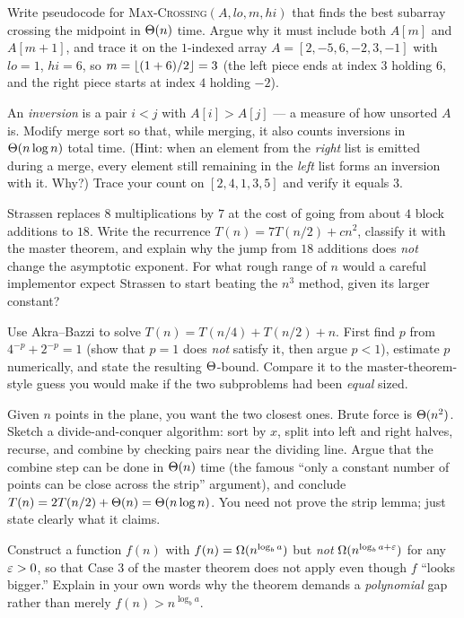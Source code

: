 \begin{exercise}
Write pseudocode for \textsc{Max-Crossing}$(A,lo,m,hi)$ that finds the best
subarray crossing the midpoint in $\Theta(n)$ time. Argue why it must include both
$A[m]$ and $A[m+1]$, and trace it on the $1$-indexed array
$A=[2,-5,6,-2,3,-1]$ with $lo=1$, $hi=6$, so $m=\lfloor(1+6)/2\rfloor=3$ (the left
piece ends at index $3$ holding $6$, and the right piece starts at index $4$
holding $-2$).
\end{exercise}

\begin{exercise}
An \emph{inversion} is a pair $i<j$ with $A[i]>A[j]$ --- a measure of how unsorted
$A$ is. Modify merge sort so that, while merging, it also counts inversions in
$\Theta(n\log n)$ total time. (Hint: when an element from the \emph{right} list is
emitted during a merge, every element still remaining in the \emph{left} list
forms an inversion with it. Why?) Trace your count on $[2,4,1,3,5]$ and verify it
equals $3$.
\end{exercise}

\begin{exercise}
Strassen replaces $8$ multiplications by $7$ at the cost of going from
about $4$ block additions to $18$. Write the recurrence
$T(n)=7T(n/2)+cn^2$, classify it with the master theorem, and explain why the jump
from $18$ additions does \emph{not} change the asymptotic exponent. For what rough
range of $n$ would a careful implementor expect Strassen to start beating the
$n^3$ method, given its larger constant?
\end{exercise}

\begin{exercise}
Use Akra--Bazzi to solve $T(n)=T(n/4)+T(n/2)+n$. First find $p$ from
$4^{-p}+2^{-p}=1$ (show that $p=1$ does \emph{not} satisfy it, then argue $p<1$),
estimate $p$ numerically, and state the resulting $\Theta$-bound. Compare it to the
master-theorem-style guess you would make if the two subproblems had been
\emph{equal} sized.
\end{exercise}

\begin{exercise}
Given $n$ points in the plane, you want the two closest ones. Brute force is
$\Theta(n^2)$. Sketch a divide-and-conquer algorithm: sort by $x$, split into left
and right halves, recurse, and combine by checking pairs near the dividing line.
Argue that the combine step can be done in $\Theta(n)$ time (the famous ``only a
constant number of points can be close across the strip'' argument), and conclude
$T(n)=2T(n/2)+\Theta(n)=\Theta(n\log n)$. You need not prove the strip lemma; just state
clearly what it claims.
\end{exercise}

\begin{exercise}
Construct a function $f(n)$ with $f(n)=\Omega(n^{\log_b a})$ but \emph{not}
$\Omega(n^{\log_b a + \varepsilon})$ for any $\varepsilon>0$, so that Case 3 of the master theorem
does not apply even though $f$ ``looks bigger.'' Explain in your own words why the
theorem demands a \emph{polynomial} gap rather than merely $f(n) > n^{\log_b a}$.
\end{exercise}
